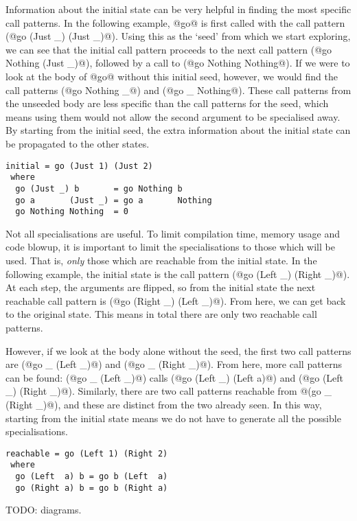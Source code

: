 Information about the initial state can be very helpful in finding the most specific call patterns.
In the following example, @go@ is first called with the call pattern (@go (Just _) (Just _)@).
Using this as the `seed' from which we start exploring, we can see that the initial call pattern proceeds to the next call pattern (@go Nothing (Just _)@), followed by a call to (@go Nothing Nothing@).
If we were to look at the body of @go@ without this initial seed, however, we would find the call patterns (@go Nothing _@) and (@go _ Nothing@).
These call patterns from the unseeded body are less specific than the call patterns for the seed, which means using them would not allow the second argument to be specialised away.
By starting from the initial seed, the extra information about the initial state can be propagated to the other states.

\begin{lstlisting}
initial = go (Just 1) (Just 2)
 where
  go (Just _) b       = go Nothing b
  go a       (Just _) = go a       Nothing
  go Nothing Nothing  = 0
\end{lstlisting}

Not all specialisations are useful.
To limit compilation time, memory usage and code blowup, it is important to limit the specialisations to those which will be used.
That is, \emph{only} those which are reachable from the initial state.
In the following example, the initial state is the call pattern (@go (Left _) (Right _)@).
At each step, the arguments are flipped, so from the initial state the next reachable call pattern is (@go (Right _) (Left _)@).
From here, we can get back to the original state.
This means in total there are only two reachable call patterns.

However, if we look at the body alone without the seed, the first two call patterns are (@go _ (Left _)@) and (@go _ (Right _)@).
From here, more call patterns can be found: (@go _ (Left _)@) calls (@go (Left _) (Left a)@) and (@go (Left _) (Right _)@).
Similarly, there are two call patterns reachable from @(go _ (Right _)@), and these are distinct from the two already seen.
In this way, starting from the initial state means we do not have to generate all the possible specialisations.

\begin{lstlisting}
reachable = go (Left 1) (Right 2)
 where
  go (Left  a) b = go b (Left  a)
  go (Right a) b = go b (Right a)
\end{lstlisting}

TODO: diagrams.

